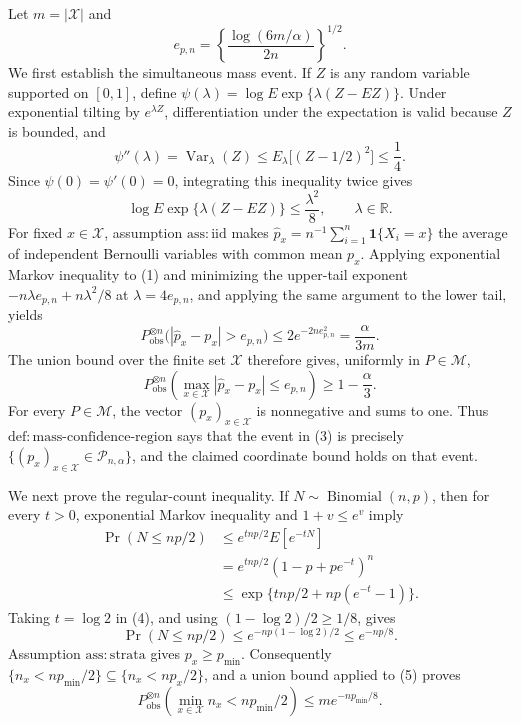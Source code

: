 Let \(m=|\mathcal X|\) and
\[
 e_{p,n}=\left\{\frac{\log(6m/\alpha)}{2n}\right\}^{1/2}.
\]
We first establish the simultaneous mass event.  If \(Z\) is any random variable supported on \([0,1]\), define
\(\psi(\lambda)=\log E\exp\{\lambda(Z-EZ)\}\).  Under exponential tilting by \(e^{\lambda Z}\), differentiation under the expectation is valid because \(Z\) is bounded, and
\[
 \psi''(\lambda)=\operatorname{Var}_{\lambda}(Z)
 \le E_{\lambda}\bigl[(Z-1/2)^2\bigr]\le\frac14.
\]
Since \(\psi(0)=\psi'(0)=0\), integrating this inequality twice gives
\[
 \log E\exp\{\lambda(Z-EZ)\}\le\frac{\lambda^2}{8},
 \qquad \lambda\in\mathbb R.                                      \tag{1}
\]
For fixed \(x\in\mathcal X\), assumption \(\mathrm{ass{:}iid}\) makes
\(\widehat p_x=n^{-1}\sum_{i=1}^n\mathbf 1\{X_i=x\}\) the average of independent Bernoulli variables with common mean \(p_x\).  Applying exponential Markov inequality to (1) and minimizing the upper-tail exponent
\(-n\lambda e_{p,n}+n\lambda^2/8\) at \(\lambda=4e_{p,n}\), and applying the same argument to the lower tail, yields
\[
 P_{\mathrm{obs}}^{\otimes n}
 \bigl(|\widehat p_x-p_x|>e_{p,n}\bigr)
 \le 2e^{-2ne_{p,n}^2}=\frac{\alpha}{3m}.                           \tag{2}
\]
The union bound over the finite set \(\mathcal X\) therefore gives, uniformly in \(P\in\mathcal M\),
\[
 P_{\mathrm{obs}}^{\otimes n}
 \left(\max_{x\in\mathcal X}|\widehat p_x-p_x|\le e_{p,n}\right)
 \ge1-\frac{\alpha}{3}.                                             \tag{3}
\]
For every \(P\in\mathcal M\), the vector \((p_x)_{x\in\mathcal X}\) is nonnegative and sums to one.  Thus \(\mathrm{def{:}mass\text{-}confidence\text{-}region}\) says that the event in (3) is precisely
\(\{(p_x)_{x\in\mathcal X}\in\mathcal P_{n,\alpha}\}\), and the claimed coordinate bound holds on that event.

We next prove the regular-count inequality.  If \(N\sim\operatorname{Binomial}(n,p)\), then for every \(t>0\), exponential Markov inequality and \(1+v\le e^v\) imply
\[
 \begin{aligned}
 \Pr(N\le np/2)
 &\le e^{tnp/2}E[e^{-tN}]\\
 &=e^{tnp/2}(1-p+pe^{-t})^n\\
 &\le\exp\{tnp/2+np(e^{-t}-1)\}.
 \end{aligned}                                                       \tag{4}
\]
Taking \(t=\log2\) in (4), and using \((1-\log2)/2\ge1/8\), gives
\[
 \Pr(N\le np/2)\le e^{-np(1-\log2)/2}\le e^{-np/8}.                \tag{5}
\]
Assumption \(\mathrm{ass{:}strata}\) gives \(p_x\ge p_{\min}\).  Consequently
\(\{n_x<np_{\min}/2\}\subseteq\{n_x<np_x/2\}\), and a union bound applied to (5) proves
\[
 P_{\mathrm{obs}}^{\otimes n}
 \left(\min_{x\in\mathcal X}n_x<np_{\min}/2\right)
 \le m e^{-np_{\min}/8}.                                           \tag{6}
\]

